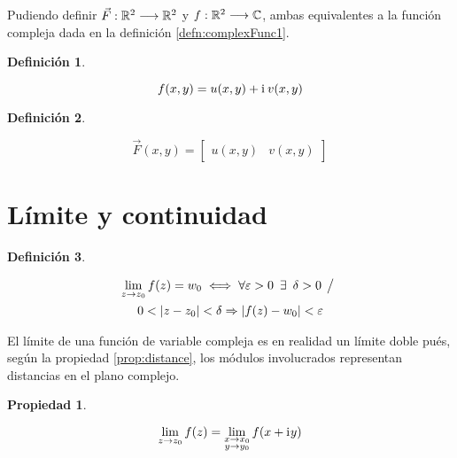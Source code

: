 \documentclass[a5paper,12pt,twoside]{book}
\newtheorem{defn}{{Definición}}[chapter]
\newtheorem{prop}{{Propiedad}}[chapter]
\begin{document}
Pudiendo definir $\Vec{F}: \mathbb{R}^2 \longrightarrow \mathbb{R}^2$ y $f: \mathbb{R}^2 \longrightarrow \mathbb{C}$, ambas equivalentes a la función compleja dada en la definición \ref{defn:complexFunc1}.

\begin{mdframed}[style=MyFrame1]
    \begin{defn}
    \end{defn}
    \begin{equation*}
        f(x,y) = u(x,y) + \mathrm{i}\mkern1mu \, v(x,y)
    \end{equation*}
\end{mdframed}

\begin{mdframed}[style=MyFrame1]
    \begin{defn}
    \end{defn}
    \begin{equation*}
        \Vec{F}(x,y) = \begin{bmatrix} u(x,y) & v(x,y) \end{bmatrix}
    \end{equation*}
\end{mdframed}


\section{Límite y continuidad}

\begin{mdframed}[style=MyFrame1]
    \begin{defn}
    \end{defn}
    \begin{multline*}
        \lim_{z \to z_0} f(z) = w_0 \iff \forall \varepsilon > 0 \enspace \exists \enspace \delta > 0 \hspace{1ex} \big/ \hspace{1ex}
        \\
        0 < {\left| {z-z_0} \right|} < \delta \Rightarrow {\left| {f(z)-w_0} \right|} < \varepsilon
    \end{multline*}
\end{mdframed}

El límite de una función de variable compleja es en realidad un límite doble pués, según la propiedad \ref{prop:distance}, los módulos involucrados representan distancias en el plano complejo.

\begin{mdframed}[style=MyFrame1]
    \begin{prop}
        \label{prop:limit}
    \end{prop}
    \begin{equation*}
        \lim_{z \to z_0} f(z) = \lim_{\substack{x \to x_0\\y \to y_0}} f(x + \mathrm{i}\mkern1mu y)
    \end{equation*}
\end{mdframed}
\end{document}
